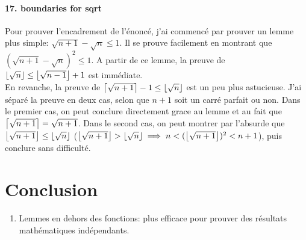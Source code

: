 \documentclass[a4paper]{article}%
\DeclarePairedDelimiter\ceil{\lceil}{\rceil}
\DeclarePairedDelimiter\floor{\lfloor}{\rfloor}
\begin{document}
	\paragraph{17. boundaries for sqrt} Pour prouver l'encadrement de l'énoncé, j'ai commencé par prouver un lemme plus simple:
	$\sqrt{n+1}-\sqrt{n}\leq 1$. Il se prouve facilement en montrant que $(\sqrt{n+1}-\sqrt{n})^2\leq 1$.
	A partir de ce lemme, la preuve de $\floor*{\sqrt{n}} \leq \floor*{\sqrt{n-1}}+1$ est immédiate.\\
	En revanche, la preuve de $\ceil*{\sqrt{n+1}}-1 \leq \floor*{\sqrt{n}}$ est un peu plus astucieuse.
	J'ai séparé la preuve en deux cas, selon que $n+1$ soit un carré parfait ou non. Dans le premier cas,
	on peut conclure directement grace au lemme et au fait que $\ceil*{\sqrt{n+1}}=\sqrt{n+1}$.
	Dans le second cas, on peut montrer par l'absurde que $\floor*{\sqrt{n+1}}\leq \floor*{\sqrt{n}}$
	($\floor*{\sqrt{n+1}} > \floor*{\sqrt{n}} \implies n < (\floor*{\sqrt{n+1}})^2 < n+1$),
	puis conclure sans difficulté.

	\section{Conclusion}
		
	\begin{enumerate}
		\item Lemmes en dehors des fonctions: plus efficace pour prouver des résultats mathématiques indépendants.
	\end{enumerate}
\end{document}
